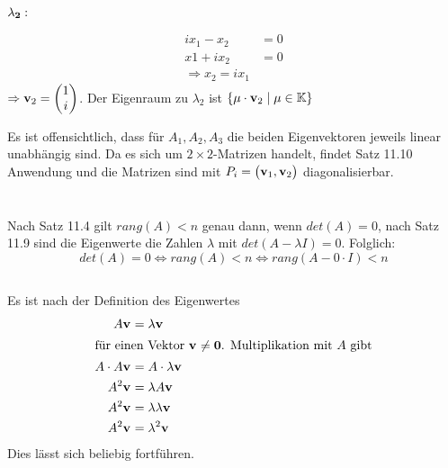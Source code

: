 \documentclass{../mfa}
\begin{document}
$\mathbf{\lambda_2:}$
\par 
\begin{align*}
   ix_1  -x_2 &= 0 \\
   x1  + ix_2 &= 0 \\
   \Rightarrow x_2 = ix_1
\end{align*}
$\Rightarrow \mathbf{v}_{2} = \begin{pmatrix} 1 \\ i \end{pmatrix}$. Der Eigenraum zu
   $\lambda_2$ ist $\{\mu \cdot \mathbf{v}_{2} \mid \mu \in \mathbb{K}\}$

Es ist offensichtlich, dass für $A_1, A_2, A_3$ die beiden Eigenvektoren jeweils
linear unabhängig sind. Da es sich um $2\times 2$-Matrizen handelt, findet Satz
11.10 Anwendung und die Matrizen sind mit $P_i = \begin{pmatrix}\mathbf{v}_{1}, \mathbf{v}_{2}
\end{pmatrix}$ diagonalisierbar.

\section{}
\section{}
\subsection{}
Nach Satz 11.4 gilt $rang(A) < n$ genau dann, wenn $det(A) = 0$, nach Satz 11.9
sind die Eigenwerte die Zahlen $\lambda$ mit $det(A - \lambda I) = 0$. Folglich:
\begin{equation*}
   det(A) = 0 \Leftrightarrow rang(A) < n \Leftrightarrow rang(A - 0\cdot I) < n
\end{equation*}

\subsection{}
Es ist nach der Definition des Eigenwertes 
\begin{align*}
   A\mathbf{v}_{} &= \lambda \mathbf{v}_{} \\
   \intertext{für einen Vektor $\mathbf{v}_{}\neq \mathbf{0}$. Multiplikation mit $A$ gibt}
   A\cdot A \mathbf{v}_{} &= A\cdot \lambda \mathbf{v}_{} \\
   A^2 \mathbf{v}_{} &= \lambda A \mathbf{v}_{} \\
   A^2 \mathbf{v}_{} &= \lambda \lambda \mathbf{v}_{} \\
   A^2 \mathbf{v}_{} &= \lambda^2 \mathbf{v}_{}
\end{align*}
Dies lässt sich beliebig fortführen.
\end{document}
